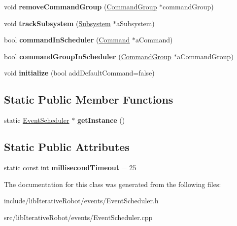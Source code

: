 \begin{DoxyCompactItemize}
void {\bfseries remove\+Command\+Group} (\mbox{\hyperlink{classlib_iterative_robot_1_1_command_group}{Command\+Group}} $\ast$command\+Group)
\item 
\mbox{\label{classlib_iterative_robot_1_1_event_scheduler_a1130cfd602dec9e4091571b47b60f378}} 
void {\bfseries track\+Subsystem} (\mbox{\hyperlink{classlib_iterative_robot_1_1_subsystem}{Subsystem}} $\ast$a\+Subsystem)
\item 
\mbox{\label{classlib_iterative_robot_1_1_event_scheduler_acc46d20d5b6e1b6d308bf64dd12ea791}} 
bool {\bfseries command\+In\+Scheduler} (\mbox{\hyperlink{classlib_iterative_robot_1_1_command}{Command}} $\ast$a\+Command)
\item 
\mbox{\label{classlib_iterative_robot_1_1_event_scheduler_af47242d40b09df43698bb00cbe4f9300}} 
bool {\bfseries command\+Group\+In\+Scheduler} (\mbox{\hyperlink{classlib_iterative_robot_1_1_command_group}{Command\+Group}} $\ast$a\+Command\+Group)
\item 
\mbox{\label{classlib_iterative_robot_1_1_event_scheduler_a8d45ea3763e171da6e3990acdd864df3}} 
void {\bfseries initialize} (bool add\+Default\+Command=false)
\end{DoxyCompactItemize}
\subsection*{Static Public Member Functions}
\begin{DoxyCompactItemize}
\item 
\mbox{\label{classlib_iterative_robot_1_1_event_scheduler_a04480f5533265708f49b23e622ffe9cb}} 
static \mbox{\hyperlink{classlib_iterative_robot_1_1_event_scheduler}{Event\+Scheduler}} $\ast$ {\bfseries get\+Instance} ()
\end{DoxyCompactItemize}
\subsection*{Static Public Attributes}
\begin{DoxyCompactItemize}
\item 
\mbox{\label{classlib_iterative_robot_1_1_event_scheduler_a5c2a1365cdcf713b0dbe722b9156290e}} 
static const int {\bfseries millisecond\+Timeout} = 25
\end{DoxyCompactItemize}


The documentation for this class was generated from the following files\+:\begin{DoxyCompactItemize}
\item 
include/lib\+Iterative\+Robot/events/Event\+Scheduler.\+h\item 
src/lib\+Iterative\+Robot/events/Event\+Scheduler.\+cpp\end{DoxyCompactItemize}
